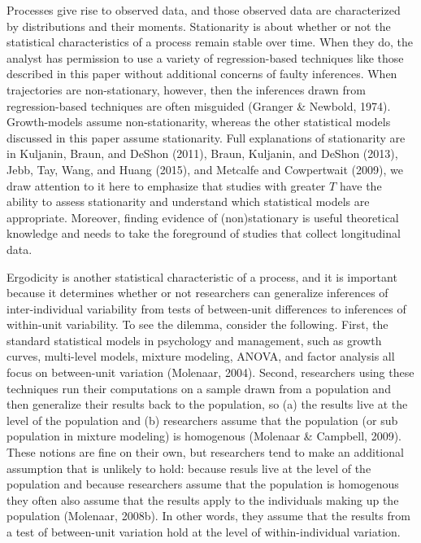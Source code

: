 \documentclass[english,,man]{apa6}
\theoremstyle{definition}
\theoremstyle{definition}
\theoremstyle{definition}
\theoremstyle{remark}
\begin{document}
Processes give rise to observed data, and those observed data are
characterized by distributions and their moments. Stationarity is about
whether or not the statistical characteristics of a process remain
stable over time. When they do, the analyst has permission to use a
variety of regression-based techniques like those described in this
paper without additional concerns of faulty inferences. When
trajectories are non-stationary, however, then the inferences drawn from
regression-based techniques are often misguided (Granger \& Newbold,
1974). Growth-models assume non-stationarity, whereas the other
statistical models discussed in this paper assume stationarity. Full
explanations of stationarity are in Kuljanin, Braun, and DeShon (2011),
Braun, Kuljanin, and DeShon (2013), Jebb, Tay, Wang, and Huang (2015),
and Metcalfe and Cowpertwait (2009), we draw attention to it here to
emphasize that studies with greater \(T\) have the ability to assess
stationarity and understand which statistical models are appropriate.
Moreover, finding evidence of (non)stationary is useful theoretical
knowledge and needs to take the foreground of studies that collect
longitudinal data.

Ergodicity is another statistical characteristic of a process, and it is
important because it determines whether or not researchers can
generalize inferences of inter-individual variability from tests of
between-unit differences to inferences of within-unit variability. To
see the dilemma, consider the following. First, the standard statistical
models in psychology and management, such as growth curves, multi-level
models, mixture modeling, ANOVA, and factor analysis all focus on
between-unit variation (Molenaar, 2004). Second, researchers using these
techniques run their computations on a sample drawn from a population
and then generalize their results back to the population, so (a) the
results live at the level of the population and (b) researchers assume
that the population (or sub population in mixture modeling) is
homogenous (Molenaar \& Campbell, 2009). These notions are fine on their
own, but researchers tend to make an additional assumption that is
unlikely to hold: because resuls live at the level of the population and
because researchers assume that the population is homogenous they often
also assume that the results apply to the individuals making up the
population (Molenaar, 2008b). In other words, they assume that the
results from a test of between-unit variation hold at the level of
within-individual variation.
\end{document}

